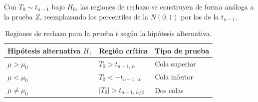 \documentclass[12pt, a4paper]{book}
\numberwithin{equation}{chapter}
\begin{document}
Con $T_0 \sim t_{n-1}$ bajo $H_0$, las
regiones de rechazo se construyen de forma
an\'{a}loga a la prueba $Z$, reemplazando
los percentiles de la $N(0,1)$ por los
de la $t_{n-1}$.

\begin{table}[H]
	\centering
	\begin{tabular}{lll}
		\toprule
		\textbf{Hip\'{o}tesis alternativa
			$H_1$} &
		\textbf{Regi\'{o}n cr\'{i}tica} &
		\textbf{Tipo de prueba} \\
		\midrule
		$\mu > \mu_0$ &
		$T_0 > t_{n-1,\,\alpha}$ &
		Cola superior \\[4pt]
		$\mu < \mu_0$ &
		$T_0 < -t_{n-1,\,\alpha}$ &
		Cola inferior \\[4pt]
		$\mu \neq \mu_0$ &
		$|T_0| > t_{n-1,\,\alpha/2}$ &
		Dos colas \\
		\bottomrule
	\end{tabular}
	\caption{Regiones de rechazo para la
		prueba $t$ seg\'{u}n la hip\'{o}tesis
		alternativa.}
	\label{tab:regiones-t}
\end{table}
\end{document}
